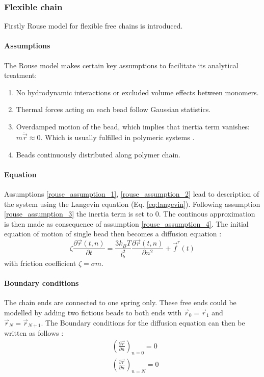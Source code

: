 \documentclass[
    paper=A4,pagesize=automedia,fontsize=12pt,
    BCOR=15mm,DIV=22,
    twoside,headinclude,footinclude=false,
    fleqn,             %
    bibliography=totocnumbered,          %
    listof=totoc,                %
    listof=flat,                 %
    cleardoublepage=empty      %
    numbers=endperiod
]{scrartcl}
\begin{document}
\subsubsection{Flexible chain} \label{sec:rouse_flexible_chain}
Firstly Rouse model for flexible free chains is introduced.
\paragraph{Assumptions}
The Rouse model makes certain key assumptions to facilitate its analytical treatment:
\begin{enumerate}
    \item \label{rouse_assumption_1} No hydrodynamic interactions or excluded volume effects between monomers.
    \item \label{rouse_assumption_2} Thermal forces acting on each bead follow Gaussian statistics.
    \item \label{rouse_assumption_3} Overdamped motion of the bead, which implies that inertia term vanishes: $m \ddot{\vec{r}} \approx 0$.
    Which is usually fulfilled in polymeric systems \cite{Doi_Intro_PP:2005}.
    \item \label{rouse_assumption_4} Beads continuously distributed along polymer chain.
\end{enumerate}

\paragraph{Equation}
Assumptions \ref{rouse_assumption_1}, \ref{rouse_assumption_2} lead to description of the
system using the Langevin equation (Eq. \ref{eq:langevin}). Following assumption \ref{rouse_assumption_3} 
the inertia term is set to 0. The continous approximation is then made as consequence of assumption \ref{rouse_assumption_4}.
The initial equation of motion of single bead then becomes a diffusion equation \cite{Rub_Colby_PolyPhy:2005}:
\begin{equation}
    \label{eq:diffusion}
    \zeta \frac{\partial \vec{r}(t,n)}{\partial t} = \frac{3 k_B T}{l_b^2} \frac{\partial \vec{r}(t,n)}{\partial n^2} + \vec{f}^r(t)
\end{equation}
with friction coefficient $\zeta = \sigma m$.

\paragraph{Boundary conditions}
The chain ends are connected to one spring only. These free ends could be modelled by adding two 
fictious beads to both ends with $\vec{r}_0=\vec{r}_1$ and $\vec{r}_N=\vec{r}_{N+1}$. The Boundary 
conditions for the diffusion equation can then be written as follows \cite{Rub_Colby_PolyPhy:2005}:
\begin{equation}
    \label{eq:rouse_boundary}
    \begin{aligned}
        & \left(\frac{\partial \vec{r}}{\partial n}\right)_{n=0} = 0\\
        & \left(\frac{\partial \vec{r}}{\partial n}\right)_{n=N} = 0
    \end{aligned}
\end{equation}
\end{document}
